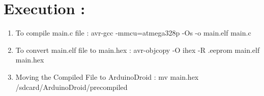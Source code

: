\documentclass[12pt,a4paper]{article}
\begin{document}
\section{Execution : }
\begin{enumerate}
    \item To compile main.c file : avr-gcc -mmcu=atmega328p -Os -o main.elf main.c
    \item To convert main.elf file to main.hex : avr-objcopy -O ihex -R .eeprom main.elf main.hex
    \item Moving the Compiled File to ArduinoDroid : mv main.hex /sdcard/ArduinoDroid/precompiled
\end{enumerate}
\end{document}
